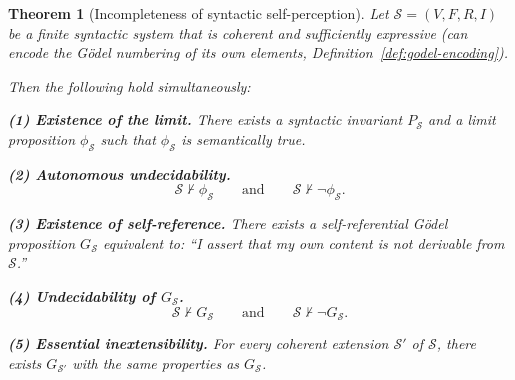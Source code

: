 \documentclass[11pt]{article}
\newtheorem{theorem}{Theorem}[section]
\begin{document}
\begin{theorem}[Incompleteness of syntactic self-perception]
\label{thm:main}
Let $\mathcal{S} = (V, F, R, I)$ be a finite syntactic system that is
coherent and sufficiently expressive (can encode the G\"odel numbering of
its own elements, Definition~\ref{def:godel-encoding}).

Then the following hold simultaneously:

\medskip
\noindent\textbf{(1) Existence of the limit.}
There exists a syntactic invariant $P_{\mathcal{S}}$ and a limit
proposition $\phi_{\mathcal{S}}$ such that $\phi_{\mathcal{S}}$ is
semantically true.

\medskip
\noindent\textbf{(2) Autonomous undecidability.}
\[
  \mathcal{S} \not\vdash \phi_{\mathcal{S}}
  \qquad\text{and}\qquad
  \mathcal{S} \not\vdash \neg \phi_{\mathcal{S}}.
\]

\medskip
\noindent\textbf{(3) Existence of self-reference.}
There exists a self-referential G\"odel proposition $G_{\mathcal{S}}$
equivalent to: ``I assert that my own content is not derivable from
$\mathcal{S}$.''

\medskip
\noindent\textbf{(4) Undecidability of $G_{\mathcal{S}}$.}
\[
  \mathcal{S} \not\vdash G_{\mathcal{S}}
  \qquad\text{and}\qquad
  \mathcal{S} \not\vdash \neg G_{\mathcal{S}}.
\]

\medskip
\noindent\textbf{(5) Essential inextensibility.}
For every coherent extension $\mathcal{S}'$ of $\mathcal{S}$, there
exists $G_{\mathcal{S}'}$ with the same properties as
$G_{\mathcal{S}}$.
\end{theorem}
\end{document}
